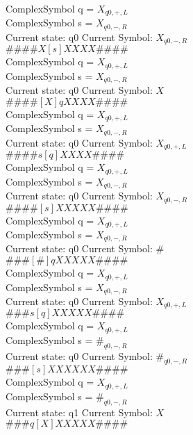 \documentclass[10pt, a4paper]{article}
\begin{document}
ComplexSymbol q = $X_{q0,+,L}$ \\
ComplexSymbol s = $X_{q0,-,R}$ \\ 
 \medskip
Current state: q0	 Current Symbol: 	 $X_{q0,-,R}$\\
$\# \#\# \# X [ s ] X X X X \# \# \# \# $ \\
ComplexSymbol q = $X_{q0,+,L}$ \\
ComplexSymbol s = $X_{q0,-,R}$ \\ 
 \medskip
Current state: q0	 Current Symbol: 	 $X$\\
$\# \#\# \# [ X ] q X X X X \# \# \# \# $ \\
ComplexSymbol q = $X_{q0,+,L}$ \\
ComplexSymbol s = $X_{q0,-,R}$ \\ 
 \medskip
Current state: q0	 Current Symbol: 	 $X_{q0,+,L}$\\
$\# \#\# \# s [ q ] X X X X \# \# \# \# $ \\
ComplexSymbol q = $X_{q0,+,L}$ \\
ComplexSymbol s = $X_{q0,-,R}$ \\ 
 \medskip
Current state: q0	 Current Symbol: 	 $X_{q0,-,R}$\\
$\# \#\# \# [ s ] X X X X X \# \# \# \# $ \\
ComplexSymbol q = $X_{q0,+,L}$ \\
ComplexSymbol s = $X_{q0,-,R}$ \\ 
 \medskip
Current state: q0	 Current Symbol: 	 $\#$\\
$\# \#\# [ \# ] q X X X X X \# \# \# \# $ \\
ComplexSymbol q = $X_{q0,+,L}$ \\
ComplexSymbol s = $X_{q0,-,R}$ \\ 
 \medskip
Current state: q0	 Current Symbol: 	 $X_{q0,+,L}$\\
$\# \#\# s [ q ] X X X X X \# \# \# \# $ \\
ComplexSymbol q = $X_{q0,+,L}$ \\
ComplexSymbol s = $\#_{q0,-,R}$ \\ 
 \medskip
Current state: q0	 Current Symbol: 	 $\#_{q0,-,R}$\\
$\# \#\# [ s ] X X X X X X \# \# \# \# $ \\
ComplexSymbol q = $X_{q0,+,L}$ \\
ComplexSymbol s = $\#_{q0,-,R}$ \\ 
 \medskip
Current state: q1	 Current Symbol: 	 $X$\\
$\# \#\# q [ X ] X X X X X \# \# \# \# $ \\
\end{document}

